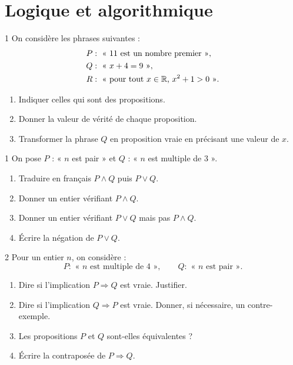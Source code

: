 \section{Logique et algorithmique}

\begin{exo}{1}
On considère les phrases suivantes :
\[
\begin{aligned}
  P&:\text{ « $11$ est un nombre premier »},\\
  Q&:\text{ « $x+4=9$ »},\\
  R&:\text{ « pour tout $x\in\mathbb{R}$, $x^2+1>0$ »}.
\end{aligned}
\]
\begin{enumerate}
  \item Indiquer celles qui sont des propositions.
  \item Donner la valeur de vérité de chaque proposition.
  \item Transformer la phrase $Q$ en proposition vraie en précisant une
  valeur de $x$.
\end{enumerate}
\end{exo}

\begin{exo}{1}
On pose $P$ : « $n$ est pair » et $Q$ : « $n$ est multiple de $3$ ».
\begin{enumerate}
  \item Traduire en français $P\land Q$ puis $P\lor Q$.
  \item Donner un entier vérifiant $P\land Q$.
  \item Donner un entier vérifiant $P\lor Q$ mais pas $P\land Q$.
  \item Écrire la négation de $P\lor Q$.
\end{enumerate}
\end{exo}

\begin{exo}{2}
Pour un entier $n$, on considère :
\[
  P:\text{ « $n$ est multiple de $4$ »},\qquad
  Q:\text{ « $n$ est pair »}.
\]
\begin{enumerate}
  \item Dire si l'implication $P\Rightarrow Q$ est vraie. Justifier.
  \item Dire si l'implication $Q\Rightarrow P$ est vraie. Donner, si
  nécessaire, un contre-exemple.
  \item Les propositions $P$ et $Q$ sont-elles équivalentes ?
  \item Écrire la contraposée de $P\Rightarrow Q$.
\end{enumerate}
\end{exo}

